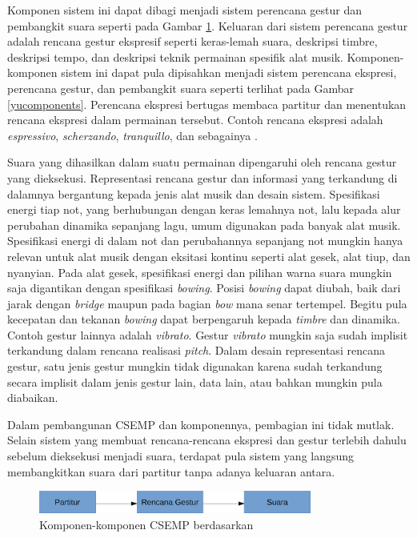 Komponen sistem ini dapat dibagi menjadi sistem perencana gestur dan pembangkit suara \parencite{Thippur2013ProbabilisticMO} seperti pada Gambar \ref{thippurcomponents}. Keluaran dari sistem perencana gestur adalah rencana gestur ekspresif seperti keras-lemah suara, deskripsi timbre, deskripsi tempo, dan deskripsi teknik permainan spesifik alat musik. Komponen-komponen sistem ini dapat pula dipisahkan menjadi sistem perencana ekspresi, perencana gestur, dan pembangkit suara \parencite{yu2017bowing} seperti terlihat pada Gambar \ref{yucomponents}. Perencana ekspresi bertugas membaca partitur dan menentukan rencana ekspresi dalam permainan tersebut. Contoh rencana ekspresi adalah \textit{espressivo}, \textit{scherzando}, \textit{tranquillo}, dan sebagainya \parencite{yang2016synthesis}.

Suara yang dihasilkan dalam suatu permainan dipengaruhi oleh rencana gestur yang dieksekusi. Representasi rencana gestur dan informasi yang terkandung di dalamnya bergantung kepada jenis alat musik dan desain sistem. Spesifikasi energi tiap not, yang berhubungan dengan keras lemahnya not, lalu kepada alur perubahan dinamika sepanjang lagu, umum digunakan pada banyak alat musik. Spesifikasi energi di dalam not dan perubahannya sepanjang not mungkin hanya relevan untuk alat musik dengan eksitasi kontinu seperti alat gesek, alat tiup, dan nyanyian. Pada alat gesek, spesifikasi energi dan pilihan warna suara mungkin saja digantikan dengan spesifikasi \textit{bowing}. Posisi \textit{bowing} dapat diubah, baik dari jarak dengan \textit{bridge} maupun pada bagian \textit{bow} mana senar tertempel. Begitu pula kecepatan dan tekanan \textit{bowing} dapat berpengaruh kepada \textit{timbre} dan dinamika. \parencite{yu2017bowing} Contoh gestur lainnya adalah \textit{vibrato}. Gestur \textit{vibrato} mungkin saja sudah implisit terkandung dalam rencana realisasi \textit{pitch}. Dalam desain representasi rencana gestur, satu jenis gestur mungkin tidak digunakan karena sudah terkandung secara implisit dalam jenis gestur lain, data lain, atau bahkan mungkin pula diabaikan.

Dalam pembangunan CSEMP dan komponennya, pembagian ini tidak mutlak. Selain sistem yang membuat rencana-rencana ekspresi dan gestur terlebih dahulu sebelum dieksekusi menjadi suara, terdapat pula sistem yang langsung membangkitkan suara dari partitur tanpa adanya keluaran antara.

\begin{figure}[h]
    \centering
    \includegraphics[width=0.8\textwidth]{resources/CSEMP-Components-Thippur.eps}
    \caption{Komponen-komponen CSEMP berdasarkan \citet{Thippur2013ProbabilisticMO}} \label{thippurcomponents}
\end{figure}

